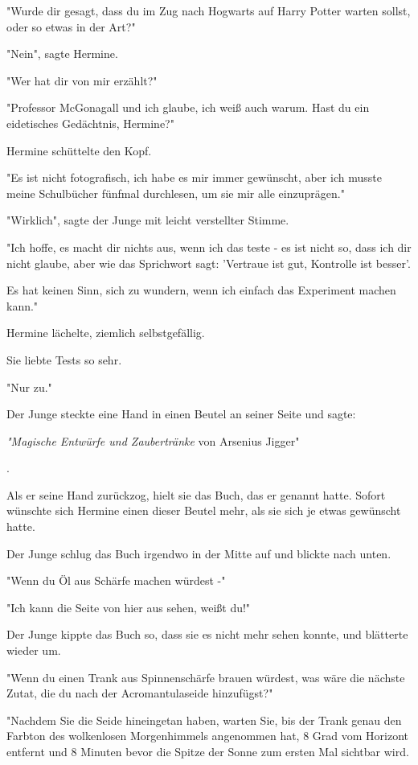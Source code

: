 {"Wurde dir gesagt, dass du im Zug nach Hogwarts auf Harry Potter warten sollst, oder so etwas in der Art?"

"Nein", sagte Hermine.

"Wer hat dir von mir erzählt?"

"Professor McGonagall und ich glaube, ich weiß auch warum. Hast du ein eidetisches Gedächtnis, Hermine?"

Hermine schüttelte den Kopf.

"Es ist nicht fotografisch, ich habe es mir immer gewünscht, aber ich musste meine Schulbücher fünfmal durchlesen, um sie mir alle einzuprägen."

"Wirklich", sagte der Junge mit leicht verstellter Stimme.

"Ich hoffe, es macht dir nichts aus, wenn ich das teste - es ist nicht so, dass ich dir nicht glaube, aber wie das Sprichwort sagt: 'Vertraue ist gut, Kontrolle ist besser'.

Es hat keinen Sinn, sich zu wundern, wenn ich einfach das Experiment machen kann."

Hermine lächelte, ziemlich selbstgefällig.

Sie liebte Tests so sehr.

"Nur zu."

Der Junge steckte eine Hand in einen Beutel an seiner Seite und sagte:

\emph{"Magische Entwürfe und Zaubertränke} von Arsenius Jigger"

.

Als er seine Hand zurückzog, hielt sie das Buch, das er genannt hatte. Sofort wünschte sich Hermine einen dieser Beutel mehr, als sie sich je etwas gewünscht hatte.

Der Junge schlug das Buch irgendwo in der Mitte auf und blickte nach unten.

"Wenn du Öl aus Schärfe machen würdest -"

"Ich kann die Seite von hier aus sehen, weißt du!"

Der Junge kippte das Buch so, dass sie es nicht mehr sehen konnte, und blätterte wieder um.

"Wenn du einen Trank aus Spinnenschärfe brauen würdest, was wäre die nächste Zutat, die du nach der Acromantulaseide hinzufügst?"

"Nachdem Sie die Seide hineingetan haben, warten Sie, bis der Trank genau den Farbton des wolkenlosen Morgenhimmels angenommen hat, 8 Grad vom Horizont entfernt und 8 Minuten bevor die Spitze der Sonne zum ersten Mal sichtbar wird.

}
